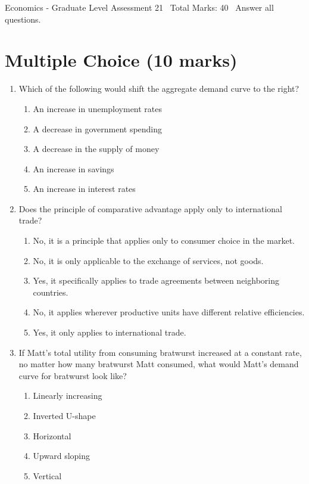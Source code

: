\documentclass[12pt]{article}
\begin{document}
\begin{center}
Economics - Graduate Level Assessment 21 \
Total Marks: 40 \
Answer all questions.
\end{center}

\section*{Multiple Choice (10 marks)}
\begin{enumerate}[label=\arabic*.]
\item Which of the following would shift the aggregate demand curve to the right?
\begin{enumerate}[label=(\alph*)]
    \item An increase in unemployment rates
    \item A decrease in government spending
    \item A decrease in the supply of money
    \item An increase in savings
    \item An increase in interest rates
\end{enumerate}
\item Does the principle of comparative advantage apply only to international trade?
\begin{enumerate}[label=(\alph*)]
    \item No, it is a principle that applies only to consumer choice in the market.
    \item No, it is only applicable to the exchange of services, not goods.
    \item Yes, it specifically applies to trade agreements between neighboring countries.
    \item No, it applies wherever productive units have different relative efficiencies.
    \item Yes, it only applies to international trade.
\end{enumerate}
\item If Matt's total utility from consuming bratwurst increased at a constant rate, no matter how many bratwurst Matt consumed, what would Matt's demand curve for bratwurst look like?
\begin{enumerate}[label=(\alph*)]
    \item Linearly increasing
    \item Inverted U-shape
    \item Horizontal
    \item Upward sloping
    \item Vertical

\end{enumerate}
\end{enumerate}
\end{document}

